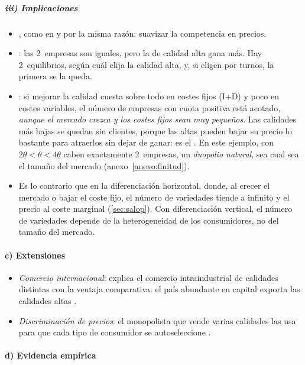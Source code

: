 \documentclass[11pt]{article}
\begin{document}
\subparagraph{iii) Implicaciones}

\begin{itemize}
\item {}, como en  y por la misma razón: suavizar la competencia en precios.
\item {}: las 2~empresas son iguales, pero la de calidad alta gana más. Hay 2~equilibrios, según cuál elija la calidad alta, y, si eligen por turnos, la primera se la queda.
\item {}: si mejorar la calidad cuesta sobre todo en costes fijos (I+D) y poco en costes variables, el número de empresas con cuota positiva está acotado, \emph{aunque el mercado crezca y los costes fijos sean muy pequeños}\nocite{ShakedSutton1983Natural}. Las calidades más bajas se quedan sin clientes, porque las altas pueden bajar su precio lo bastante para atraerlos sin dejar de ganar: es el . En este ejemplo, con $2\underline{\theta}<\overline{\theta}<4\underline{\theta}$ caben exactamente 2~empresas, un \emph{duopolio natural}, sea cual sea el tamaño del mercado (anexo~\ref{anexo:finitud}).
\item Es lo contrario que en la diferenciación horizontal, donde, al crecer el mercado o bajar el coste fijo, el número de variedades tiende a infinito y el precio al coste marginal (\ref{sec:salop}). Con diferenciación vertical, el número de variedades depende de la heterogeneidad de los consumidores, no del tamaño del mercado.
\end{itemize}

\paragraph{c) Extensiones}

\begin{itemize}
\item \emph{Comercio internacional}: \textcite{Falvey1981Commercial} explica el comercio intraindustrial de calidades distintas con la ventaja comparativa: el país abundante en capital exporta las calidades altas .
\item \emph{Discriminación de precios}: el monopolista que vende varias calidades las usa para que cada tipo de consumidor se autoseleccione\nocite{MussaRosen1978Monopoly} .
\end{itemize}

\paragraph{d) Evidencia empírica}
\end{document}
